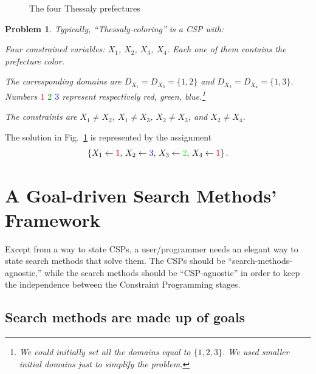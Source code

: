 \documentclass{ws-ijait}
\newtheorem{problem}{Problem}
\begin{document}
\begin{figure}
  \centering
  
  \caption{The four Thessaly prefectures\label{map-colored}}
\end{figure}

\begin{problem}
  \label{thessaly-coloring}
  Typically, \emph{``Thessaly-coloring''} is a CSP with:
  \begin{romanlist}
    \item Four constrained variables: $X_1$, $X_2$, $X_3$,
          $X_4$. Each one of them contains the prefecture
          color.
    \item The corresponding domains are $D_{X_1} = D_{X_3} =
          \{1, 2\}$ and $D_{X_2} = D_{X_4} = \{1, 3\}$.
          Numbers \textcolor{red}{$1$}
          \textcolor{green}{$2$} \textcolor{blue}{$3$}
          represent respectively red, green,
          blue.\footnote{We could initially set all the
          domains equal to $\{1, 2, 3\}$. We used smaller
          initial domains just to simplify the problem.}
    \item The constraints are $X_1 \neq X_2$, $X_1 \neq
          X_3$, $X_2 \neq X_3$, and $X_2 \neq X_4$.
  \end{romanlist}
\end{problem}
The solution in Fig.~\ref{map-colored} is represented by the
assignment
\begin{equation}
  \label{solution}
  \{ X_1 \gets \textcolor{red}{1}, \, X_2 \gets
  \textcolor{blue}{3}, \, X_3 \gets \textcolor{green}{2}, \,
  X_4 \gets \textcolor{red}{1} \} \, .
\end{equation}


\section{A Goal-driven Search Methods' Framework}

Except from a way to state CSPs, a user\slash programmer
needs an elegant way to state search methods that solve
them. The CSPs should be ``search-methods-agnostic,'' while
the search methods should be ``CSP-agnostic'' in order to
keep the independence between the Constraint Programming
stages.

\subsection{Search methods are made up of goals}
\end{document}
